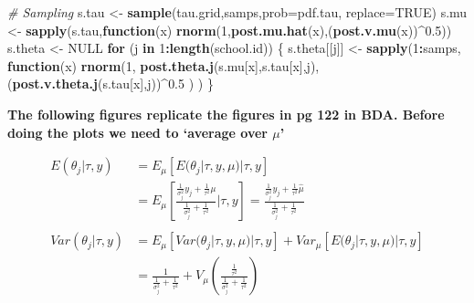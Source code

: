 \documentclass[]{article}
\newenvironment{Shaded}{\begin{snugshade}}{\end{snugshade}}
\newcommand{\KeywordTok}[1]{\textcolor[rgb]{0.13,0.29,0.53}{\textbf{#1}}}
\newcommand{\DataTypeTok}[1]{\textcolor[rgb]{0.13,0.29,0.53}{#1}}
\newcommand{\DecValTok}[1]{\textcolor[rgb]{0.00,0.00,0.81}{#1}}
\newcommand{\FloatTok}[1]{\textcolor[rgb]{0.00,0.00,0.81}{#1}}
\newcommand{\StringTok}[1]{\textcolor[rgb]{0.31,0.60,0.02}{#1}}
\newcommand{\CommentTok}[1]{\textcolor[rgb]{0.56,0.35,0.01}{\textit{#1}}}
\newcommand{\OtherTok}[1]{\textcolor[rgb]{0.56,0.35,0.01}{#1}}
\newcommand{\ControlFlowTok}[1]{\textcolor[rgb]{0.13,0.29,0.53}{\textbf{#1}}}
\newcommand{\OperatorTok}[1]{\textcolor[rgb]{0.81,0.36,0.00}{\textbf{#1}}}
\newcommand{\NormalTok}[1]{#1}
\begin{document}
\begin{Shaded}
\begin{Highlighting}[]
\CommentTok{# Sampling}
\NormalTok{s.tau           <-}\StringTok{ }\KeywordTok{sample}\NormalTok{(tau.grid,samps,}\DataTypeTok{prob=}\NormalTok{pdf.tau, }\DataTypeTok{replace=}\OtherTok{TRUE}\NormalTok{)}
\NormalTok{s.mu            <-}\StringTok{ }\KeywordTok{sapply}\NormalTok{(s.tau,}\ControlFlowTok{function}\NormalTok{(x) }\KeywordTok{rnorm}\NormalTok{(}\DecValTok{1}\NormalTok{,}\KeywordTok{post.mu.hat}\NormalTok{(x),(}\KeywordTok{post.v.mu}\NormalTok{(x))}\OperatorTok{^}\FloatTok{0.5}\NormalTok{))}
\NormalTok{s.theta         <-}\StringTok{ }\OtherTok{NULL} 
\ControlFlowTok{for}\NormalTok{ (j }\ControlFlowTok{in} \DecValTok{1}\OperatorTok{:}\KeywordTok{length}\NormalTok{(school.id)) \{}
\NormalTok{  s.theta[[j]]         <-}\StringTok{ }\KeywordTok{sapply}\NormalTok{(}\DecValTok{1}\OperatorTok{:}\NormalTok{samps, }
                            \ControlFlowTok{function}\NormalTok{(x) }
                            \KeywordTok{rnorm}\NormalTok{(}\DecValTok{1}\NormalTok{,}
                                  \KeywordTok{post.theta.j}\NormalTok{(s.mu[x],s.tau[x],j),}
\NormalTok{                                  (}\KeywordTok{post.v.theta.j}\NormalTok{(s.tau[x],j))}\OperatorTok{^}\FloatTok{0.5}
\NormalTok{                                  ) )}
\NormalTok{  \}}
\end{Highlighting}
\end{Shaded}

\textbf{The following figures replicate the figures in pg 122 in BDA.
Before doing the plots we need to `average over \(\mu\)'}

\[
\begin{aligned}
E(\theta_{j}|\tau,y)   &= E_{\mu}\left[E(\theta_{j}|\tau,y,\mu)|\tau,y\right] \nonumber \\
                       &= E_{\mu}\left[\frac{ \frac{1}{\sigma_{j}^{2}}y_{j}  + \frac{1}{\tau^{2}}\mu }{\frac{1}{\sigma_{j}^{2}}  + \frac{1}{\tau^{2} } }|\tau,y\right] = \frac{ \frac{1}{\sigma_{j}^{2}}y_{j}  + \frac{1}{\tau^{2}}\hat{\mu} }{\frac{1}{\sigma_{j}^{2}}  + \frac{1}{\tau^{2} } }\\
\nonumber \\                       
Var(\theta_{j}|\tau,y) &= E_{\mu}\left[Var(\theta_{j}|\tau,y,\mu)|\tau,y\right] + Var_{\mu}\left[E(\theta_{j}|\tau,y,\mu)|\tau,y\right] \nonumber \\
                      &= \frac{1}{\frac{1}{\sigma_{j}^{2}}  + \frac{1}{\tau^{2} }} + V_{\mu}\left(\frac{\frac{1}{\tau^{2}}}{\frac{1}{\sigma_{j}^{2}}  + \frac{1}{\tau^{2} }}\right)
\end{aligned}
\]
\end{document}
